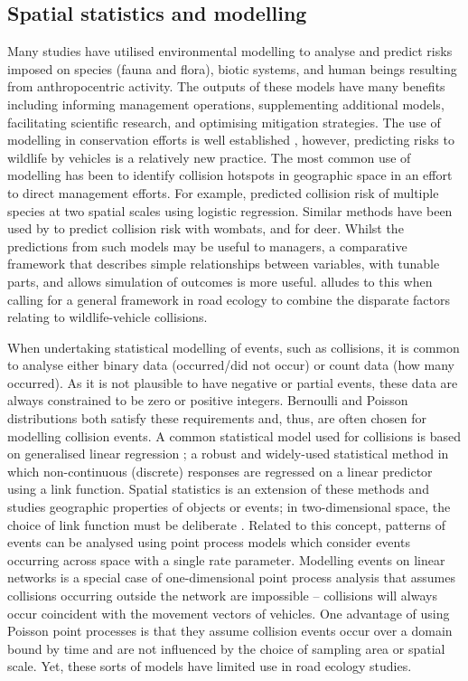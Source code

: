 \subsection{Spatial statistics and modelling}

Many studies have utilised environmental modelling to analyse and predict risks imposed on species (fauna and flora), biotic systems, and human beings resulting from anthropocentric activity. The outputs of these models have many benefits including informing management operations, supplementing additional models, facilitating scientific research, and optimising mitigation strategies. The use of modelling in conservation efforts is well established \citep{star86}, however, predicting risks to wildlife by vehicles is a relatively new practice. The most common use of modelling has been to identify collision hotspots in geographic space in an effort to direct management efforts. For example, \cite{malo04} predicted collision risk of multiple species at two spatial scales using logistic regression. Similar methods have been used by \cite{roge09} to predict collision risk with wombats, and \cite{sudh09} for deer. Whilst the predictions from such models may be useful to managers, a comparative framework that describes simple relationships between variables, with tunable parts, and allows simulation of outcomes is more useful. \cite{clev15} alludes to this when calling for a general framework in road ecology to combine the disparate factors relating to wildlife-vehicle collisions.

When undertaking statistical modelling of events, such as collisions, it is common to analyse either binary data (occurred/did not occur) or count data (how many occurred).  As it is not plausible to have negative or partial events, these data are always constrained to be zero or positive integers. Bernoulli and Poisson distributions both satisfy these requirements and, thus, are often chosen for modelling collision events. A common statistical model used for collisions is based on generalised linear regression \citep{mccu89}; a robust and widely-used statistical method in which non-continuous (discrete) responses are regressed on a linear predictor using a link function. Spatial statistics is an extension of these methods and studies geographic properties of objects or events; in two-dimensional space, the choice of link function must be deliberate \citep{badd10}. Related to this concept, patterns of events can be analysed using point process models which consider events occurring across space with a single rate parameter. Modelling events on linear networks is a special case of one-dimensional point process analysis that assumes collisions occurring outside the network are impossible \citep{okab09} -- collisions will always occur coincident with the movement vectors of vehicles. One advantage of using Poisson point processes is that they assume collision events occur over a domain bound by time and are not influenced by the choice of sampling area or spatial scale. Yet, these sorts of models have limited use in road ecology studies.

